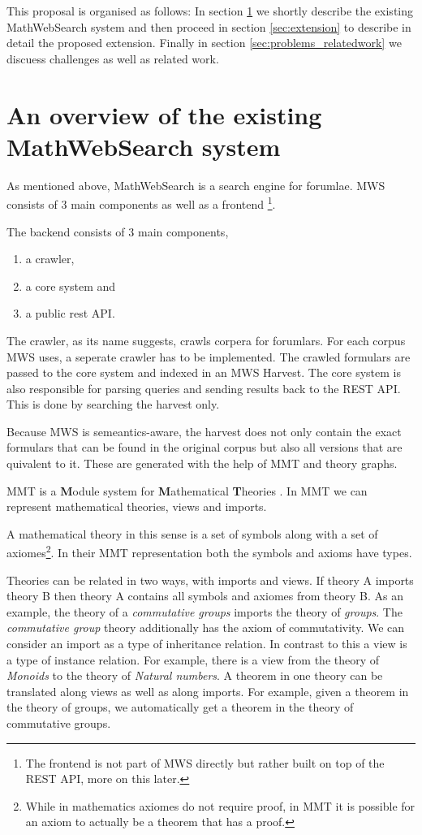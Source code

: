 \documentclass[11pt]{article}
\begin{document}
This proposal is organised as follows: In section \ref{sec:mws} we shortly describe the existing MathWebSearch system and then proceed in section \ref{sec:extension} to describe in detail the proposed extension. Finally in section \ref{sec:problems_relatedwork} we discuess challenges as well as related work.

\section{An overview of the existing MathWebSearch system}
\label{sec:mws}

As mentioned above, MathWebSearch is a search engine for forumlae. MWS consists of 3 main components as well as a frontend \footnote{The frontend is not part of MWS directly but rather built on top of the REST API, more on this later. }\cite{KohPro:MWSmanual}.

The backend consists of 3 main components,
\begin{enumerate}
  \item a crawler,
  \item a core system and
  \item a public rest API.
\end{enumerate}

The crawler, as its name suggests, crawls corpera for forumlars. For each corpus MWS uses, a seperate crawler has to be implemented. The crawled formulars are passed to the core system and indexed in an MWS Harvest. The core system is also responsible for parsing queries and sending results back to the REST API. This is done by searching the harvest only.

Because MWS is semeantics-aware, the harvest does not only contain the exact formulars that can be found in the original corpus but also all versions that are quivalent to it. These are generated with the help of MMT and theory graphs.

MMT is a \textbf{M}odule system for \textbf{M}athematical \textbf{T}heories \cite{RabKoh:WSMSML13}. In MMT we can represent mathematical theories, views and imports.

A mathematical theory in this sense is a set of symbols along with a set of axiomes\footnote{While in mathematics axiomes do not require proof, in MMT it is possible for an axiom to actually be a theorem that has a proof. }. In their MMT representation both the symbols and axioms have types.

Theories can be related in two ways, with imports and views. If theory A imports theory B then theory A contains all symbols and axiomes from theory B. As an example, the theory of a \textit{commutative groups} imports the theory of \textit{groups}. The \textit{commutative group} theory additionally has the axiom of commutativity. We can consider an import as a type of inheritance relation. In contrast to this a view is a type of instance relation. For example, there is a view from the theory of \textit{Monoids} to the theory of \textit{Natural numbers}. A theorem in one theory can be translated along views as well as along imports. For example, given a theorem in the theory of groups, we automatically get a theorem in the theory of commutative groups.
\end{document}

